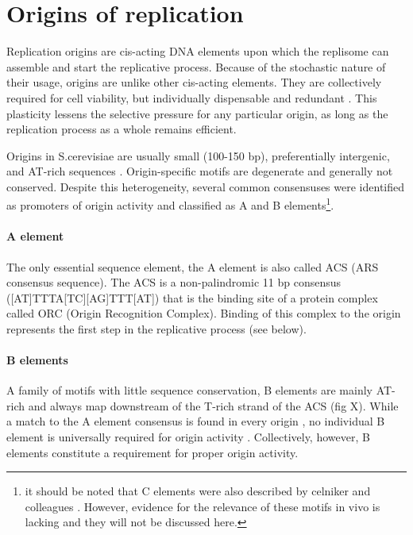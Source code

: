 \section{Origins of replication}

Replication origins are cis-acting DNA elements upon which the replisome can assemble and start the replicative process. Because of the stochastic nature of their usage, origins are unlike other cis-acting elements. 
They are collectively required for cell viability, but individually dispensable and redundant \cite{bogenschutz:2014:initiation, dershowitz:2007:linear}. 
This plasticity lessens the selective pressure for any particular origin, as long as the replication process as a whole remains efficient. 


Origins in S.cerevisiae are usually small (100-150 bp), preferentially intergenic, and AT-rich sequences \cite{raghuraman:2016:sequence}. 
Origin-specific motifs are degenerate and generally not conserved. Despite this heterogeneity, several common consensuses were identified as promoters of origin activity and classified as A and B elements\footnote{it should be noted that C elements were also described by celniker and colleagues \cite{celniker:1984:deletion}. However, evidence for the relevance of these motifs in vivo is lacking and they will not be discussed here.}.


\paragraph{A element}
The only essential sequence element, the A element is also called ACS (ARS consensus sequence). 
The ACS is a non-palindromic 11 bp consensus ([AT]TTTA[TC][AG]TTT[AT])\cite{celniker:1984:deletion,nieduszynski:2006:genomewide} that is the binding site of a protein complex called ORC (Origin Recognition Complex). 
Binding of this complex to the origin represents the first step in the replicative process (see below)\cite{diffley:1992:proteindna}.


\paragraph{B elements}
A family of motifs with little sequence conservation, B elements are mainly AT-rich and always map downstream of the T-rich strand of the ACS (fig X)\cite{raghuraman:2016:sequence}. 
While a match to the A element consensus is found in every origin \cite{celniker:1984:deletion}, no individual B element is universally required for origin activity \cite{marahrens:1992:yeast,lucas:2003:dynamics}. Collectively, however, B elements constitute a requirement for proper origin activity.

